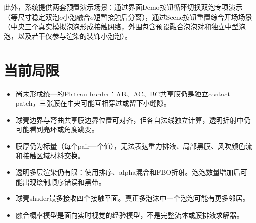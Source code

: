 此外，系统提供两套预置演示场景：通过界面Demo按钮循环切换双泡专项演示（等尺寸稳定双泡$	o$小泡融合$	o$短暂接触后分离），通过Scene按钮重置综合开场场景（中央三个真实模拟泡泡形成接触网络，外围包含预设融合泡泡对和独立中型泡泡，以及若干仅参与渲染的装饰小泡泡）。

\section{当前局限}

\begin{itemize}
  \item 尚未形成统一的Plateau border：AB、AC、BC共享膜仍是独立contact patch，三张膜在中央可能互相穿过或留下小缝隙。
  \item 球壳边界与弯曲共享膜边界位置可对齐，但各自法线独立计算，透明折射中仍可能看到亮环或角度跳变。
  \item 膜厚仍为标量（每个pair一个值），无法表达重力排液、局部黑膜、风吹颜色流和接触区域材料交换。
  \item 透明多层渲染仍有限：使用排序、alpha混合和FBO折射。泡泡数量增加后可能出现绘制顺序错误和黑带。
  \item 球壳shader最多接收四个接触平面。真正多泡沫中一个泡泡可能有更多邻居。
  \item 融合概率模型是面向实时视觉的经验模型，不是完整流体或膜排液求解器。
\end{itemize}
